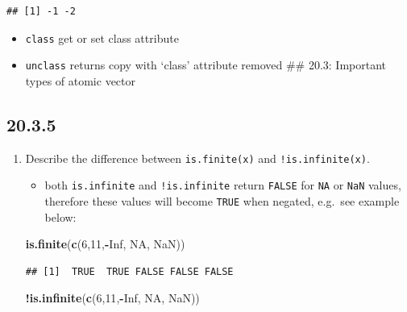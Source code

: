 \documentclass[]{book}
\newenvironment{Shaded}{\begin{snugshade}}{\end{snugshade}}
\newcommand{\DecValTok}[1]{\textcolor[rgb]{0.00,0.00,0.81}{#1}}
\newcommand{\KeywordTok}[1]{\textcolor[rgb]{0.13,0.29,0.53}{\textbf{#1}}}
\newcommand{\NormalTok}[1]{#1}
\newcommand{\OperatorTok}[1]{\textcolor[rgb]{0.81,0.36,0.00}{\textbf{#1}}}
\newcommand{\OtherTok}[1]{\textcolor[rgb]{0.56,0.35,0.01}{#1}}
\providecommand{\tightlist}{%
  \setlength{\itemsep}{0pt}\setlength{\parskip}{0pt}}
\theoremstyle{definition}
\theoremstyle{definition}
\theoremstyle{definition}
\theoremstyle{remark}
\begin{document}
\begin{verbatim}
## [1] -1 -2
\end{verbatim}

\begin{itemize}
\tightlist
\item
  \texttt{class} get or set class attribute
\item
  \texttt{unclass} returns copy with `class' attribute removed \#\#
  20.3: Important types of atomic vector
\end{itemize}

\hypertarget{section-68}{%
\subsection{20.3.5}\label{section-68}}

\begin{enumerate}
\def\labelenumi{\arabic{enumi}.}
\item
  Describe the difference between \texttt{is.finite(x)} and
  \texttt{!is.infinite(x)}.

  \begin{itemize}
  \tightlist
  \item
    both \texttt{is.infinite} and \texttt{!is.infinite} return
    \texttt{FALSE} for \texttt{NA} or \texttt{NaN} values, therefore
    these values will become \texttt{TRUE} when negated, e.g.~see
    example below:
  \end{itemize}

\begin{Shaded}
\begin{Highlighting}[]
\KeywordTok{is.finite}\NormalTok{(}\KeywordTok{c}\NormalTok{(}\DecValTok{6}\NormalTok{,}\DecValTok{11}\NormalTok{,}\OperatorTok{-}\OtherTok{Inf}\NormalTok{, }\OtherTok{NA}\NormalTok{, }\OtherTok{NaN}\NormalTok{))}
\end{Highlighting}
\end{Shaded}

\begin{verbatim}
## [1]  TRUE  TRUE FALSE FALSE FALSE
\end{verbatim}

\begin{Shaded}
\begin{Highlighting}[]
\OperatorTok{!}\KeywordTok{is.infinite}\NormalTok{(}\KeywordTok{c}\NormalTok{(}\DecValTok{6}\NormalTok{,}\DecValTok{11}\NormalTok{,}\OperatorTok{-}\OtherTok{Inf}\NormalTok{, }\OtherTok{NA}\NormalTok{, }\OtherTok{NaN}\NormalTok{))}
\end{Highlighting}
\end{Shaded}


\end{enumerate}
\end{document}
